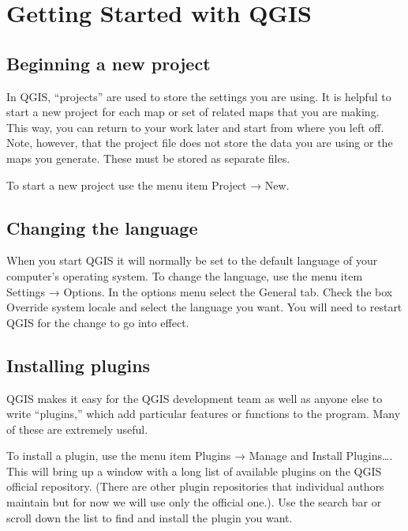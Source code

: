 \documentclass[]{book}
\begin{document}
\hypertarget{getting-started-with-qgis}{%
\chapter{Getting Started with QGIS}\label{getting-started-with-qgis}}

\hypertarget{beginning-a-new-project}{%
\section{Beginning a new project}\label{beginning-a-new-project}}

In QGIS, ``projects'' are used to store the settings you are using. It is helpful to start a new project for each map or set of related maps that you are making. This way, you can return to your work later and start from where you left off. Note, however, that the project file does not store the data you are using or the maps you generate. These must be stored as separate files.

To start a new project use the menu item Project → New.

\hypertarget{changing-the-language}{%
\section{Changing the language}\label{changing-the-language}}

When you start QGIS it will normally be set to the default language of your computer's operating system. To change the language, use the menu item Settings → Options. In the options menu select the General tab. Check the box Override system locale and select the language you want. You will need to restart QGIS for the change to go into effect.

\hypertarget{installing-plugins}{%
\section{Installing plugins}\label{installing-plugins}}

QGIS makes it easy for the QGIS development team as well as anyone else to write ``plugins,'' which add particular features or functions to the program. Many of these are extremely useful.

To install a plugin, use the menu item Plugins → Manage and Install Plugins\ldots{}. This will bring up a window with a long list of available plugins on the QGIS official repository. (There are other plugin repositories that individual authors maintain but for now we will use only the official one.). Use the search bar or scroll down the list to find and install the plugin you want.
\end{document}
